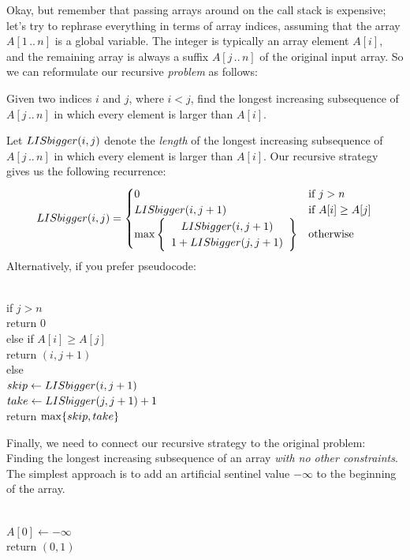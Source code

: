 Okay, but remember that passing arrays around on the call stack is expensive; let’s try to rephrase everything in terms of array indices, assuming that the array $A[1\,..\,n]$ is a global variable.
The integer  is typically an array element $A[i]$, and the remaining array is always a suffix $A[j\,..\,n]$ of the original input array.
So we can reformulate our recursive \textit{problem} as follows:
\begin{problembox}
Given two indices $i$ and $j$, where $i < j$, find the longest increasing subsequence of $A[j\,..\,n]$ in which every element is larger than $A[i]$.
\end{problembox}
Let $LISbigger(i, j)$ denote the \textit{length} of the longest increasing subsequence of $A[j\,..\,n]$ in which every element is larger than $A[i]$.
Our recursive strategy gives us the following recurrence:
\[
LISbigger(i, j) = \begin{cases}
0 & \text{if } j > n\\
LISbigger(i, j+1) & \text{if } A[i] \ge A[j]\\
\max\left\{\begin{array}{c} LISbigger(i, j+1)\\ 1 + LISbigger(j, j+1) \end{array}\right\} & \text{otherwise}
\end{cases}
\]
Alternatively, if you prefer pseudocode:

\begin{pseudocode}
\\
if $j > n$\\
\Indent return $0$\\
else if $A[i] \ge A[j]$\\
\Indent return $(i, j+1)$\\
else\\
\Indent $skip \gets LISbigger(i, j+1)$\\
\Indent $take \gets LISbigger(j, j+1) + 1$\\
\Indent return $\max\{skip, take\}$
\end{pseudocode}

Finally, we need to connect our recursive strategy to the original problem: Finding the longest increasing subsequence of an array \textit{with no other constraints}.
The simplest approach is to add an artificial sentinel value $-\infty$ to the beginning of the array.

\begin{pseudocode}
\\
$A[0] \gets -\infty$\\
return $(0, 1)$
\end{pseudocode}

